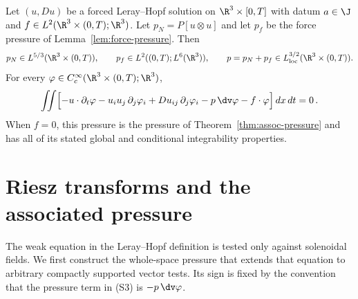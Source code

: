\documentclass[11pt,reqno]{amsart}
\begin{document}
\begin{theorem}\label{thm:assoc-pressure-forced}
Let $(u,Du)$ be a forced Leray--Hopf solution on
$\R^3\times[0,T]$ with datum $a\in\J$ and
$f\in L^2(\R^3\times(0,T);\R^3)$. Let
$p_N=P[u\otimes u]$ and let $p_f$ be the force pressure of
Lemma~\ref{lem:force-pressure}. Then
\[
 p_N\in L^{5/3}(\R^3\times(0,T)),\qquad
 p_f\in L^2((0,T);L^6(\R^3)),\qquad
 p=p_N+p_f\in L^{3/2}_{\mathrm{loc}}(\R^3\times(0,T)).
\]
For every $\varphi\in C_c^\infty(\R^3\times(0,T);\R^3)$,
\[
 \iint\Bigl[-u\cdot\partial_t\varphi-u_i u_j\,\partial_j\varphi_i
       +Du_{ij}\,\partial_j\varphi_i-p\,\dv\varphi
       -f\cdot\varphi\Bigr]\,dx\,dt=0\,.
\]
When $f=0$, this pressure is the pressure of Theorem~\ref{thm:assoc-pressure}
and has all of its stated global and conditional integrability properties.
\end{theorem}

\section{Riesz transforms and the associated pressure}\label{sec:riesz-pressure}

The weak equation in the Leray--Hopf definition is tested only against
solenoidal fields. We first construct the whole-space pressure that extends
that equation to arbitrary compactly supported vector tests. Its sign is fixed
by the convention that the pressure term in (S3) is $-p\,\dv\varphi$.
\end{document}
